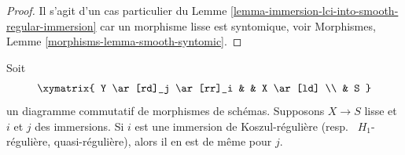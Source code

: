\begin{proof}
Il s'agit d'un cas particulier du Lemme  \ref{lemma-immersion-lci-into-smooth-regular-immersion}  car un morphisme lisse est
syntomique, voir Morphismes, Lemme  \ref{morphisms-lemma-smooth-syntomic}.
\end{proof}

\begin{lemma}
\label{lemma-push-regular-immersion-thru-smooth}
Soit
$$
\xymatrix{
Y \ar[rd]_j \ar[rr]_i & & X \ar[ld] \\
& S
}
$$
un diagramme commutatif de morphismes de schémas. Supposons  $X \to S$  lisse et
 $i$  et  $j$  des immersions. Si  $i$  est une immersion de
Koszul-régulière (resp. \ $H_1$-régulière, quasi-régulière),
alors il en est de même pour  $j$.
\end{lemma}

